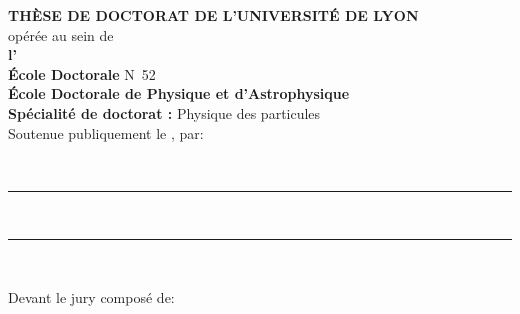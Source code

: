 {\large\textbf{THÈSE DE DOCTORAT DE L'UNIVERSITÉ DE LYON}}\\
opérée au sein de\\
\textbf{l'\insertinstitute}\\
\vspace{\baselineskip}
\textbf{École Doctorale} N\degree\ 52\\
\textbf{École Doctorale de Physique et d'Astrophysique}\\
\vspace{\baselineskip}
\textbf{Spécialité de doctorat :} Physique des particules\\
\vspace{\baselineskip}
\vspace{\baselineskip}
\vspace{\baselineskip}
Soutenue publiquement le \insertdate, par:

\vspace{.25cm}

{\Large\textbf{\insertauthor}}\\
\vspace{\baselineskip}
\vspace{\baselineskip}
\rule{\linewidth}{.5pt}\\
\vspace{\baselineskip}
{\LARGE\textbf{\inserttitle}}
\vspace{.5\baselineskip}

\rule{\linewidth}{.5pt}\\
\vspace{\baselineskip}
\vspace{\baselineskip}
\begin{flushleft}
    Devant le jury composé de:
\end{flushleft}


